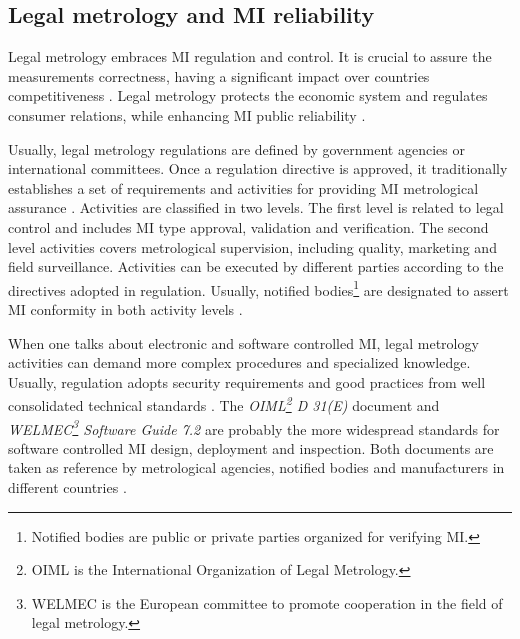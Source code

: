 \documentclass[journal]{IEEEtran}
\begin{document}
\subsection{Legal metrology and MI reliability}
\label{s:mi_realiability}
Legal metrology embraces MI regulation and control. It is crucial to assure the measurements correctness, having a significant impact over countries competitiveness \cite{RodriguesFilho2015}. Legal metrology protects the economic system and regulates consumer relations, while enhancing MI public reliability \cite{Oppermann2016}.

Usually, legal metrology regulations are defined by government agencies or international committees. Once a regulation directive is approved, it traditionally establishes a set of requirements and activities for providing MI metrological assurance \cite{RodriguesFilho2015}. Activities are classified in two levels. The first level is related to legal control and includes MI type approval, validation and verification. The second level activities covers metrological supervision, including quality, marketing and field surveillance. Activities can be executed by different parties according to the directives adopted in regulation. Usually, notified bodies\footnote{Notified bodies are public or private parties organized for verifying MI.} are designated to assert MI conformity in both activity levels \cite{Esche2015,Oppermann2016}. 

When one talks about electronic and software controlled MI, legal metrology activities can demand more complex procedures and specialized knowledge. Usually, regulation adopts security requirements and good practices from well consolidated technical standards \cite{Esche2015,Peters2015,Luchsinger2008}. The \emph{OIML\footnote{OIML is the International Organization of Legal Metrology.} D 31(E)} document \cite{InternationalOrganizationofLegalMetrologyOIML2008} and \emph{WELMEC\footnote{WELMEC is the European committee to promote cooperation in the field of legal metrology.} Software Guide 7.2} \cite{EuropeanCooperationinLegalMetrologyWELMEC2015} are probably the more widespread standards for software controlled MI design, deployment and inspection. Both documents are taken as reference by metrological agencies, notified bodies and manufacturers in different countries \cite{Camara2012,Peters2015}.
\end{document}
